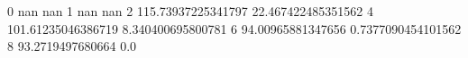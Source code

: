0 nan nan
1 nan nan
2 115.73937225341797 22.467422485351562
4 101.61235046386719 8.340400695800781
6 94.00965881347656 0.7377090454101562
8 93.2719497680664 0.0
